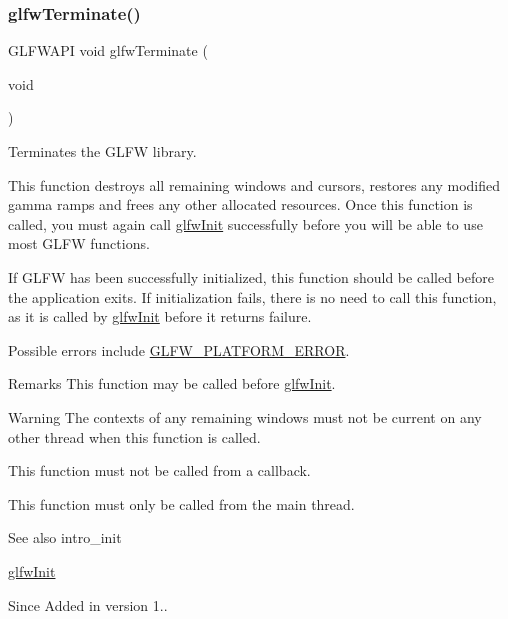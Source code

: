 \subsubsection{\texorpdfstring{glfw\+Terminate()}{glfwTerminate()}}
{\footnotesize\ttfamily G\+L\+F\+W\+A\+PI void glfw\+Terminate (\begin{DoxyParamCaption}\item[{void}]{ }\end{DoxyParamCaption})}



Terminates the G\+L\+FW library. 

This function destroys all remaining windows and cursors, restores any modified gamma ramps and frees any other allocated resources. Once this function is called, you must again call \hyperlink{group__init_gab41771f0215a2e0afb4cf1cf98082d40}{glfw\+Init} successfully before you will be able to use most G\+L\+FW functions.

If G\+L\+FW has been successfully initialized, this function should be called before the application exits. If initialization fails, there is no need to call this function, as it is called by \hyperlink{group__init_gab41771f0215a2e0afb4cf1cf98082d40}{glfw\+Init} before it returns failure.

Possible errors include \hyperlink{group__errors_gad44162d78100ea5e87cdd38426b8c7a1}{G\+L\+F\+W\+\_\+\+P\+L\+A\+T\+F\+O\+R\+M\+\_\+\+E\+R\+R\+OR}.

\begin{DoxyRemark}{Remarks}
This function may be called before \hyperlink{group__init_gab41771f0215a2e0afb4cf1cf98082d40}{glfw\+Init}.
\end{DoxyRemark}
\begin{DoxyWarning}{Warning}
The contexts of any remaining windows must not be current on any other thread when this function is called.
\end{DoxyWarning}
This function must not be called from a callback.

This function must only be called from the main thread.

\begin{DoxySeeAlso}{See also}
intro\+\_\+init 

\hyperlink{group__init_gab41771f0215a2e0afb4cf1cf98082d40}{glfw\+Init}
\end{DoxySeeAlso}
\begin{DoxySince}{Since}
Added in version 1.. 
\end{DoxySince}
